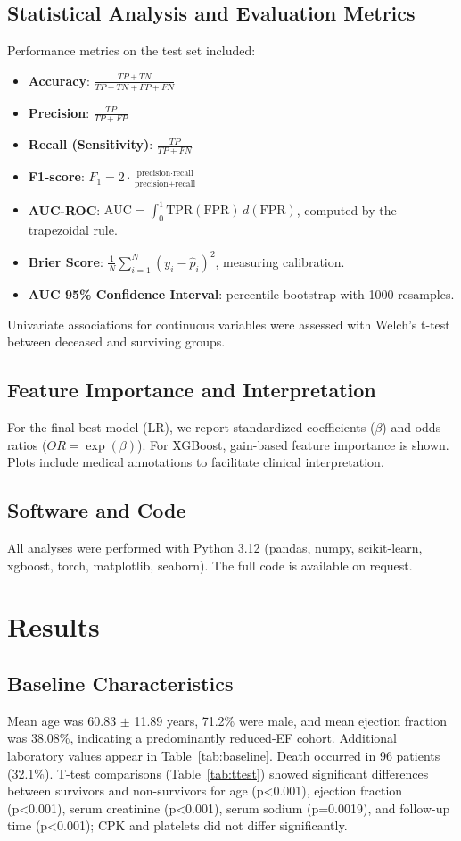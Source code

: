 \documentclass[12pt,a4paper]{article}
\begin{document}
\subsection{Statistical Analysis and Evaluation Metrics}
Performance metrics on the test set included:
\begin{itemize}
    \item \textbf{Accuracy}: $\frac{TP+TN}{TP+TN+FP+FN}$
    \item \textbf{Precision}: $\frac{TP}{TP+FP}$
    \item \textbf{Recall (Sensitivity)}: $\frac{TP}{TP+FN}$
    \item \textbf{F1-score}: $F_1 = 2 \cdot \frac{\text{precision} \cdot \text{recall}}{\text{precision} + \text{recall}}$
    \item \textbf{AUC-ROC}: $\text{AUC} = \int_0^1 \text{TPR}(\text{FPR}) \, d(\text{FPR})$, computed by the trapezoidal rule.
    \item \textbf{Brier Score}: $\frac{1}{N}\sum_{i=1}^N (y_i - \hat{p}_i)^2$, measuring calibration.
    \item \textbf{AUC 95\% Confidence Interval}: percentile bootstrap with 1000 resamples.
\end{itemize}

Univariate associations for continuous variables were assessed with Welch's t-test between deceased and surviving groups.

\subsection{Feature Importance and Interpretation}
For the final best model (LR), we report standardized coefficients ($\beta$) and odds ratios ($OR = \exp(\beta)$). For XGBoost, gain-based feature importance is shown. Plots include medical annotations to facilitate clinical interpretation.

\subsection{Software and Code}
All analyses were performed with Python 3.12 (pandas, numpy, scikit-learn, xgboost, torch, matplotlib, seaborn). The full code is available on request.

\section{Results}

\subsection{Baseline Characteristics}
Mean age was 60.83 $\pm$ 11.89 years, 71.2\% were male, and mean ejection fraction was 38.08\%, indicating a predominantly reduced-EF cohort. Additional laboratory values appear in Table~\ref{tab:baseline}. Death occurred in 96 patients (32.1\%). T-test comparisons (Table~\ref{tab:ttest}) showed significant differences between survivors and non-survivors for age (p<0.001), ejection fraction (p<0.001), serum creatinine (p<0.001), serum sodium (p=0.0019), and follow-up time (p<0.001); CPK and platelets did not differ significantly. %
\end{document}

